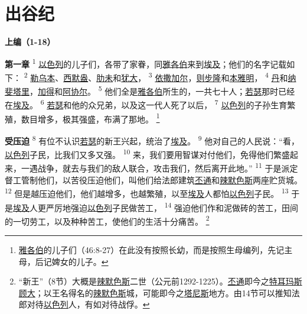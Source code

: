 \chapter*{出谷纪}


\begin{center}
	\textbf{\large{\songti 上编（1-18）}}
\end{center}

\textbf{第一章\quad}
\textsuperscript{1}
\uline{以色列}的儿子们，各带了家眷，同\uline{雅各伯}来到\uline{埃及}；他们的名字记载如下：
\textsuperscript{2}
\uline{勒乌本}、\uline{西默盎}、\uline{肋未}和\uline{犹大}，
\textsuperscript{3}
\uline{依撒}\uline{加尔}，\uline{则步隆}和\uline{本雅明}，
\textsuperscript{4}
\uline{丹}和\uline{纳斐塔里}，\uline{加得}和\uline{阿协尔}。
\textsuperscript{5}
他们全是\uline{雅各伯}所生的，一共七十人；\uline{若瑟}那时已经在\uline{埃及}。
\textsuperscript{6}
\uline{若瑟}和他的众兄弟，以及这一代人死了以后，
\textsuperscript{7}
\uline{以色列}的子孙生育繁殖，数目增多，极其强盛，布满了那地。
\renewcommand\thefootnote{\ding{\numexpr171+\value{footnote}}}
\footnote{\uline{雅各伯}的儿子们（46:8-27）在此没有按照长幼，而是按照生母编列，先记主母，后记婢女的儿子。}

\textbf{受压迫\quad}
\textsuperscript{8}
有位不认识\uline{若瑟}的新王兴起，统治了\uline{埃及}。
\textsuperscript{9}
他对自己的人民说：“看，\uline{以色列}子民，比我们又多又强。
\textsuperscript{10}
来，我们要用智谋对付他们，免得他们繁盛起来，一遇战争，就去与我们的敌人联合，攻击我们，然后离开此地。”
\textsuperscript{11}
于是派定督工管制他们，以苦役压迫他们，叫他们给法郎建筑\uline{丕通}和\uline{辣默}\uline{色斯}两座贮货城。
\textsuperscript{12}
但是越压迫他们，他们越增多，也越繁殖，以至\uline{埃及}人都怕\uline{以色列}子民。
\textsuperscript{13}
于是\uline{埃及}人更严厉地强迫\uline{以色列}子民做苦工，
\textsuperscript{14}
强迫他们作和泥做砖的苦工，田间的一切劳工，以及种种苦工，使他们的生活十分痛苦。
\footnote{“新王”（8节）大概是\uline{辣默色斯}二世（公元前1292-1225）。\uline{丕通}即今之\uline{特耳玛斯}\uline{顾大}；以王名得名的\uline{辣默色斯}城，可能即今之\uline{塔尼斯}地方。由14节可以推知法郎对待\uline{以色列}人，有如对待战俘。}

